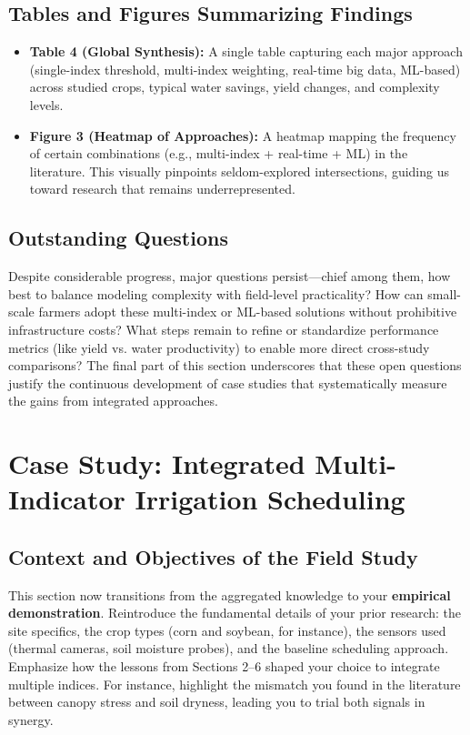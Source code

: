 \documentclass[12pt]{article}
\begin{document}
\subsection{Tables and Figures Summarizing Findings}
\begin{itemize}
\item \textbf{Table 4 (Global Synthesis):} A single table capturing each major approach (single-index threshold, multi-index weighting, real-time big data, ML-based) across studied crops, typical water savings, yield changes, and complexity levels.
\item \textbf{Figure 3 (Heatmap of Approaches):} A heatmap mapping the frequency of certain combinations (e.g., multi-index + real-time + ML) in the literature. This visually pinpoints seldom-explored intersections, guiding us toward research that remains underrepresented.
\end{itemize}

\subsection{Outstanding Questions}
Despite considerable progress, major questions persist—chief among them, how best to balance modeling complexity with field-level practicality? How can small-scale farmers adopt these multi-index or ML-based solutions without prohibitive infrastructure costs? What steps remain to refine or standardize performance metrics (like yield vs. water productivity) to enable more direct cross-study comparisons? The final part of this section underscores that these open questions justify the continuous development of case studies that systematically measure the gains from integrated approaches.



\section{Case Study: Integrated Multi-Indicator Irrigation Scheduling}

\subsection{Context and Objectives of the Field Study}
This section now transitions from the aggregated knowledge to your \textbf{empirical demonstration}. Reintroduce the fundamental details of your prior research: the site specifics, the crop types (corn and soybean, for instance), the sensors used (thermal cameras, soil moisture probes), and the baseline scheduling approach. Emphasize how the lessons from Sections 2–6 shaped your choice to integrate multiple indices. For instance, highlight the mismatch you found in the literature between canopy stress and soil dryness, leading you to trial both signals in synergy.
\end{document}
